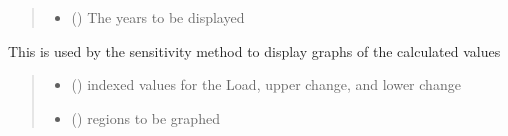 \documentclass[letterpaper,10pt,english]{sphinxmanual}
\begin{document}
\begin{fulllineitems}
\begin{fulllineitems}
\begin{quote}
\begin{description}
\begin{itemize}
\item {} 
\sphinxAtStartPar
{} (\sphinxstyleliteralemphasis{\sphinxupquote{{[}}}\sphinxstyleliteralemphasis{\sphinxupquote{{]}}}\sphinxstyleliteralemphasis{\sphinxupquote{, }}) \textendash{} The years to be displayed

\end{itemize}

\end{description}\end{quote}

\end{fulllineitems}


\begin{fulllineitems}
\label{\detokenize{src.models.residential.scripts.residential:src.models.residential.scripts.residential.residentialModule.view_sensitivity}}
\pysigstartsignatures
\pysiglinewithargsret
{}
{\sphinxparamcomma {}\sphinxparamcomma {}}
{}
\pysigstopsignatures
\sphinxAtStartPar
This is used by the sensitivity method to display graphs of the calculated values
\begin{quote}\begin{description}
\begin{itemize}
\item {} 
\sphinxAtStartPar
{} () \textendash{} indexed values for the Load, upper change, and lower change

\item {} 
\sphinxAtStartPar
{} (\sphinxstyleliteralemphasis{\sphinxupquote{{[}}}\sphinxstyleliteralemphasis{\sphinxupquote{{]}}}\sphinxstyleliteralemphasis{\sphinxupquote{, }}) \textendash{} regions to be graphed


\end{itemize}
\end{description}
\end{quote}
\end{fulllineitems}
\end{fulllineitems}
\end{document}
